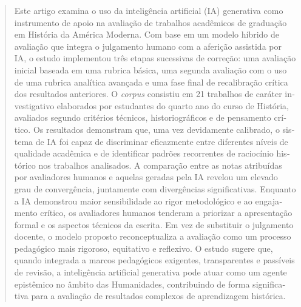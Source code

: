\documentclass[english]{textolivre}
\begin{document}
\begin{polyabstract}
\begin{portuguese}
\begin{abstract}
Este artigo examina o uso da inteligência artificial (IA) generativa como instrumento de apoio na avaliação de trabalhos acadêmicos de graduação em História da América Moderna. Com base em um modelo híbrido de avaliação que integra o julgamento humano com a aferição assistida por IA, o estudo implementou três etapas sucessivas de correção: uma avaliação inicial baseada em uma rubrica básica, uma segunda avaliação com o uso de uma rubrica analítica avançada e uma fase final de recalibração crítica dos resultados anteriores. O \textit{corpus} consistiu em 21 trabalhos de caráter investigativo elaborados por estudantes do quarto ano do curso de História, avaliados segundo critérios técnicos, historiográficos e de pensamento crítico. Os resultados demonstram que, uma vez devidamente calibrado, o sistema de IA foi capaz de discriminar eficazmente entre diferentes níveis de qualidade acadêmica e de identificar padrões recorrentes de raciocínio histórico nos trabalhos analisados. A comparação entre as notas atribuídas por avaliadores humanos e aquelas geradas pela IA revelou um elevado grau de convergência, juntamente com divergências significativas. Enquanto a IA demonstrou maior sensibilidade ao rigor metodológico e ao engajamento crítico, os avaliadores humanos tenderam a priorizar a apresentação formal e os aspectos técnicos da escrita. Em vez de substituir o julgamento docente, o modelo proposto reconceptualiza a avaliação como um processo pedagógico mais rigoroso, equitativo e reflexivo. O estudo sugere que, quando integrada a marcos pedagógicos exigentes, transparentes e passíveis de revisão, a inteligência artificial generativa pode atuar como um agente epistêmico no âmbito das Humanidades, contribuindo de forma significativa para a avaliação de resultados complexos de aprendizagem histórica.

\end{abstract}
\end{portuguese}
\end{polyabstract}
\end{document}
